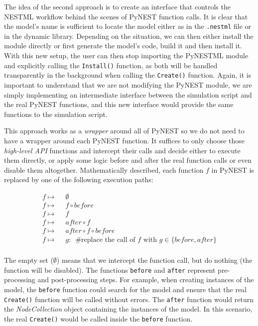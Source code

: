 The idea of the second approach is to create an interface that controls the NESTML workflow behind the scenes of PyNEST function calls. It is clear that the model's name is sufficient to locate the model either as in the \texttt{.nestml} file or in the dynamic library. Depending on the situation, we can then either install the module directly or first generate the model's code, build it and then install it. With this new setup, the user can then stop importing the PyNESTML module and explicitly calling the \texttt{Install()} function, as both will be handled transparently in the background when calling the \texttt{Create()} function. Again, it is important to understand that we are not modifying the PyNEST module, we are simply implementing an intermediate interface between the simulation script and the real PyNEST functions, and this new interface would provide the same functions to the simulation script.

This approach works as a \emph{wrapper} around all of PyNEST so we do not need to have a wrapper around each PyNEST function. It suffices to only choose those \emph{high-level API} functions and intercept their calls and decide either to execute them directly, or apply some logic before and after the real function calls or even disable them altogether. Mathematically described, each function $f$ in PyNEST is replaced by one of the following execution paths:

\begin{align*}
f \mapsto&\enspace\emptyset\\
f \mapsto&\enspace f \circ before \\
f \mapsto&\enspace f \\
f \mapsto&\enspace after \circ f \\
f \mapsto&\enspace after \circ f \circ before\\
f \mapsto&\enspace g:\enspace \text{\#replace the call of } f \text{ with } g \in \{before, after\}  \\
\end{align*}

The empty set ($\emptyset$) means that we intercept the function call, but do nothing (the function will be disabled). The functions \texttt{before} and \texttt{after} represent pre-processing and post-processing steps. For example, when creating instances of the model, the \texttt{before} function could search for the model and ensure that the real \texttt{Create()} function will be called without errors. The \texttt{after} function would return the \emph{NodeCollection} object containing the instances of the model. In this scenario, the real \texttt{Create()} would be called inside the \texttt{before} function.


